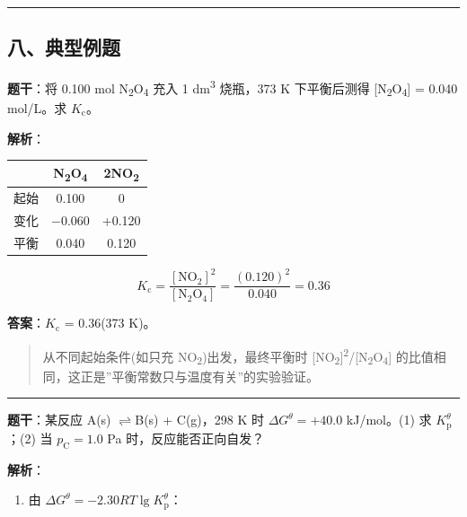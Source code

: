 \documentclass[a4paper,11pt]{ctexart}
\providecommand{\tightlist}{\setlength{\itemsep}{0pt}\setlength{\parskip}{0pt}}
\newcounter{none}
\newcommand{\箭}{\ensuremath{\rightarrow}}
\newcommand{\左箭}{\ensuremath{\leftarrow}}
\newcommand{\上箭}{\ensuremath{\uparrow}}
\newcommand{\下箭}{\ensuremath{\downarrow}}
\newcommand{\衡}{\ensuremath{\rightleftharpoons}}
\newcommand{\双箭}{\ensuremath{\leftrightarrow}}
\newcommand{\约等于}{\ensuremath{\approx}}
\newcommand{\小于等于}{\ensuremath{\leq}}
\newcommand{\大于等于}{\ensuremath{\geq}}
\newcommand{\不等于}{\ensuremath{\neq}}
\newcommand{\西格马}{\ensuremath{\sigma}}
\newcommand{\派}{\ensuremath{\pi}}
\begin{document}
\begin{center}\rule{0.5\linewidth}{0.5pt}\end{center}

\subsection{八、典型例题}\label{ux516bux5178ux578bux4f8bux9898}

\textbf{题干}：将 0.100 mol N\textsubscript{2}O\textsubscript{4} 充入 1 dm\textsuperscript{3} 烧瓶，373 K 下平衡后测得 {[}N\textsubscript{2}O\textsubscript{4}{]} = 0.040 mol/L。求 \(K_{\mathrm c}\)。

\textbf{解析}：

{\def\LTcaptype{none} %
\begin{longtable}[]{@{}lcc@{}}
\toprule\noalign{}
& N\textsubscript{2}O\textsubscript{4} & 2NO\textsubscript{2} \\
\midrule\noalign{}
\endhead
\bottomrule\noalign{}
\endlastfoot
起始 & 0.100 & 0 \\
变化 & −0.060 & +0.120 \\
平衡 & 0.040 & 0.120 \\
\end{longtable}
}

\[K_{\mathrm c} = \frac{[\mathrm{NO_2}]^2}{[\mathrm{N_2O_4}]} = \frac{(0.120)^2}{0.040} = 0.36\]

\textbf{答案}：\(K_{\mathrm c}\) = 0.36(373 K)。

\begin{quote}
从不同起始条件(如只充 NO\textsubscript{2})出发，最终平衡时 {[}NO\textsubscript{2}{]}\textsuperscript{2}/{[}N\textsubscript{2}O\textsubscript{4}{]} 的比值相同，这正是''平衡常数只与温度有关''的实验验证。
\end{quote}

\begin{center}\rule{0.5\linewidth}{0.5pt}\end{center}

\textbf{题干}：某反应 A(s) \衡 B(s) + C(g)，298 K 时 \(\Delta G^\theta = +40.0\) kJ/mol。(1) 求 \(K_{\mathrm p}^\theta\)；(2) 当 \(p_{\mathrm C} = 1.0\) Pa 时，反应能否正向自发？

\textbf{解析}：

\begin{enumerate}
\def\labelenumi{(\arabic{enumi})}
\tightlist
\item
  由 \(\Delta G^\theta = -2.30RT \lg K_{\mathrm p}^\theta\)：
\end{enumerate}
\end{document}
